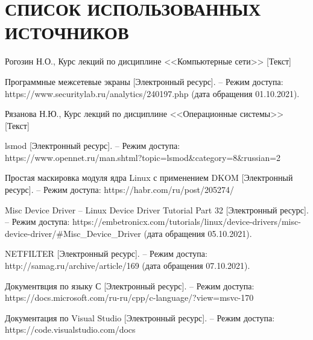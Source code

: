 \section*{СПИСОК ИСПОЛЬЗОВАННЫХ ИСТОЧНИКОВ}

\begin{thebibliography}{9}
	 Рогозин Н.О., Курс лекций по дисциплине <<Компьютерные сети>> [Текст]
	
	 Программные межсетевые экраны [Электронный ресурс]. -- Режим доступа: https://www.securitylab.ru/analytics/240197.php (дата обращения 01.10.2021).
	
	 Рязанова Н.Ю., Курс лекций по дисциплине <<Операционные системы>> [Текст]
	
	 lsmod [Электронный ресурс]. -- Режим доступа: https://www.opennet.ru/man.shtml?topic=lsmod\&category=8\&russian=2
	
	 Простая маскировка модуля ядра Linux с применением DKOM [Электронный ресурс]. -- Режим доступа: https://habr.com/ru/post/205274/
	
	 Misc Device Driver -- Linux Device Driver Tutorial Part 32 [Электронный ресурс]. --  Режим доступа: https://embetronicx.com/tutorials/linux/device-drivers/misc-device-driver/\#Misc\_Device\_Driver (дата обращения 05.10.2021).
	
	 NETFILTER [Электронный ресурс]. -- Режим доступа: http://samag.ru/archive/article/169 (дата обращения 07.10.2021).
	
	 Документвция по языку С [Электронный ресурс]. -- Режим доступа: https://docs.microsoft.com/ru-ru/cpp/c-language/?view=msvc-170
	
	 Документация по Visual Studio [Электронный ресурс]. -- Режим доступа:  https://code.visualstudio.com/docs
	
\end{thebibliography}
		
		
